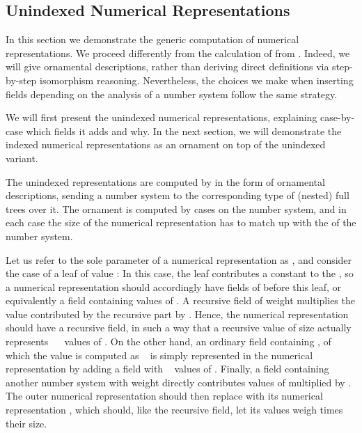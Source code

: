 \subsection{Unindexed Numerical Representations}\label{sec:trieo}
In this section we demonstrate the generic computation of numerical representations.
We proceed differently from the calculation of  from \bN{}. Indeed, we will give ornamental descriptions, rather than deriving direct definitions via step-by-step isomorphism reasoning. Nevertheless, the choices we make when inserting fields depending on the analysis of a number system follow the same strategy.

We will first present the unindexed numerical representations, explaining case-by-case which fields it adds and why. In the next section, we will demonstrate the indexed numerical representations as an ornament on top of the unindexed variant. 

The unindexed representations are computed by  in the form of ornamental descriptions, sending a number system to the corresponding type of (nested) full trees over it. The ornament is computed by cases on the number system, and in each case the size of the numerical representation has to match up with the  of the number system.

Let us refer to the sole parameter of a numerical representation as , and consider the case of a leaf of value :
In this case, the leaf contributes a constant  to the , so a numerical representation should accordingly have  fields of  before this leaf, or equivalently a field containing  values of . A recursive field of weight 
multiplies the value contributed by the recursive part by . Hence, the numerical representation should have a recursive field, in such a way that a recursive value of size  actually represents \ \AF{*}\  values of . On the other hand, an ordinary field  containing , of which the value is computed as \ 
is simply represented in the numerical representation by adding a field with \  values of . Finally, a field containing another number system  with weight 
directly contributes values of  multiplied by . The outer numerical representation should then replace  with its numerical representation , which should, like the recursive field, let its values weigh  times their size.

